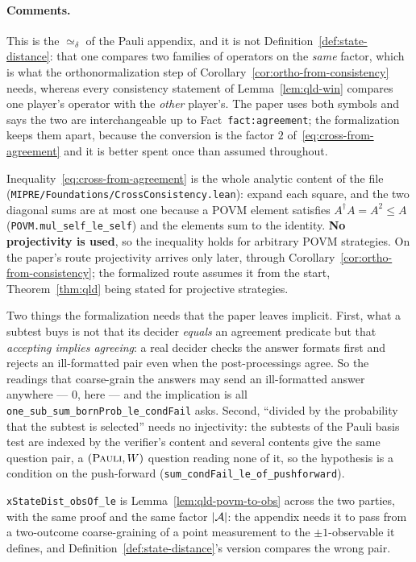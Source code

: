 \paragraph{Comments.} This is the $\simeq_\delta$ of the Pauli appendix, and it is not
Definition~\ref{def:state-distance}: that one compares two families of operators on the
\emph{same} factor, which is what the orthonormalization step of
Corollary~\ref{cor:ortho-from-consistency} needs, whereas every consistency statement of
Lemma~\ref{lem:qld-win} compares one player's operator with the \emph{other} player's. The paper
uses both symbols and says the two are interchangeable up to
Fact~\texttt{fact:agreement}; the formalization keeps them apart, because the conversion is the
factor $2$ of~\eqref{eq:cross-from-agreement} and it is better spent once than assumed
throughout.

Inequality~\eqref{eq:cross-from-agreement} is the whole analytic content of the file
(\texttt{MIPRE/Foundations/CrossConsistency.lean}): expand each square, and the two diagonal
sums are at most one because a POVM element satisfies $A^\dagger A = A^2 \leq A$
(\texttt{POVM.mul\_self\_le\_self}) and the elements sum to the identity. \textbf{No projectivity
is used}, so the inequality holds for arbitrary POVM strategies. On the paper's route projectivity
arrives only later, through Corollary~\ref{cor:ortho-from-consistency}; the formalized route
assumes it from the start, Theorem~\ref{thm:qld} being stated for projective strategies.

Two things the formalization needs that the paper leaves implicit. First, what a subtest buys is
not that its decider \emph{equals} an agreement predicate but that \emph{accepting implies
agreeing}: a real decider checks the answer formats first and rejects an ill-formatted pair even
when the post-processings agree. So the readings that coarse-grain the answers may send an
ill-formatted answer anywhere --- $0$, here --- and the implication is all
\texttt{one\_sub\_sum\_bornProb\_le\_condFail} asks. Second, ``divided by the probability that
the subtest is selected'' needs no injectivity: the subtests of the Pauli basis test are indexed
by the verifier's content and several contents give the same question pair, a $(\textsc{Pauli}, W)$
question reading none of it, so the hypothesis is a condition on the push-forward
(\texttt{sum\_condFail\_le\_of\_pushforward}).

\texttt{xStateDist\_obsOf\_le} is Lemma~\ref{lem:qld-povm-to-obs} across the two parties, with
the same proof and the same factor $\left\vert {\ensuremath{\mathcal{A}}} \right\vert$: the appendix needs it to pass from a two-outcome
coarse-graining of a point measurement to the $\pm 1$-observable it defines, and
Definition~\ref{def:state-distance}'s version compares the wrong pair.

